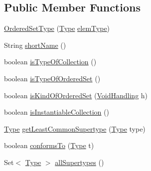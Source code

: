 \subsection*{Public Member Functions}
\begin{DoxyCompactItemize}
\item 
\hyperlink{classorg_1_1tzi_1_1use_1_1uml_1_1ocl_1_1type_1_1_ordered_set_type_aadb6a02f3d2d6a04432c6e11b8eecca5}{Ordered\-Set\-Type} (\hyperlink{interfaceorg_1_1tzi_1_1use_1_1uml_1_1ocl_1_1type_1_1_type}{Type} \hyperlink{classorg_1_1tzi_1_1use_1_1uml_1_1ocl_1_1type_1_1_collection_type_a51cda1902aa2b4a9be4a40fa9b5b7aab}{elem\-Type})
\item 
String \hyperlink{classorg_1_1tzi_1_1use_1_1uml_1_1ocl_1_1type_1_1_ordered_set_type_a3936155d1d91c22e10510099ccd28f2f}{short\-Name} ()
\item 
boolean \hyperlink{classorg_1_1tzi_1_1use_1_1uml_1_1ocl_1_1type_1_1_ordered_set_type_ade1c421746a057c5ce08ff67fd44aa4d}{is\-Type\-Of\-Collection} ()
\item 
boolean \hyperlink{classorg_1_1tzi_1_1use_1_1uml_1_1ocl_1_1type_1_1_ordered_set_type_aa50577ba52fde15f33be72b612827fbe}{is\-Type\-Of\-Ordered\-Set} ()
\item 
boolean \hyperlink{classorg_1_1tzi_1_1use_1_1uml_1_1ocl_1_1type_1_1_ordered_set_type_affcd0fe6e046f10d29eadf55f150df83}{is\-Kind\-Of\-Ordered\-Set} (\hyperlink{enumorg_1_1tzi_1_1use_1_1uml_1_1ocl_1_1type_1_1_type_1_1_void_handling}{Void\-Handling} h)
\item 
boolean \hyperlink{classorg_1_1tzi_1_1use_1_1uml_1_1ocl_1_1type_1_1_ordered_set_type_ab783934df7d5ddcffc691d6442ba612d}{is\-Instantiable\-Collection} ()
\item 
\hyperlink{interfaceorg_1_1tzi_1_1use_1_1uml_1_1ocl_1_1type_1_1_type}{Type} \hyperlink{classorg_1_1tzi_1_1use_1_1uml_1_1ocl_1_1type_1_1_ordered_set_type_aa42c4aa85e6a45904052645958e29feb}{get\-Least\-Common\-Supertype} (\hyperlink{interfaceorg_1_1tzi_1_1use_1_1uml_1_1ocl_1_1type_1_1_type}{Type} type)
\item 
boolean \hyperlink{classorg_1_1tzi_1_1use_1_1uml_1_1ocl_1_1type_1_1_ordered_set_type_a9eec60fb68e081d84c43633b367ddf7b}{conforms\-To} (\hyperlink{interfaceorg_1_1tzi_1_1use_1_1uml_1_1ocl_1_1type_1_1_type}{Type} t)
\item 
Set$<$ \hyperlink{interfaceorg_1_1tzi_1_1use_1_1uml_1_1ocl_1_1type_1_1_type}{Type} $>$ \hyperlink{classorg_1_1tzi_1_1use_1_1uml_1_1ocl_1_1type_1_1_ordered_set_type_a93a05a1e61fc1649feac9d1c02fb9f17}{all\-Supertypes} ()
\item 

\end{DoxyCompactItemize}
